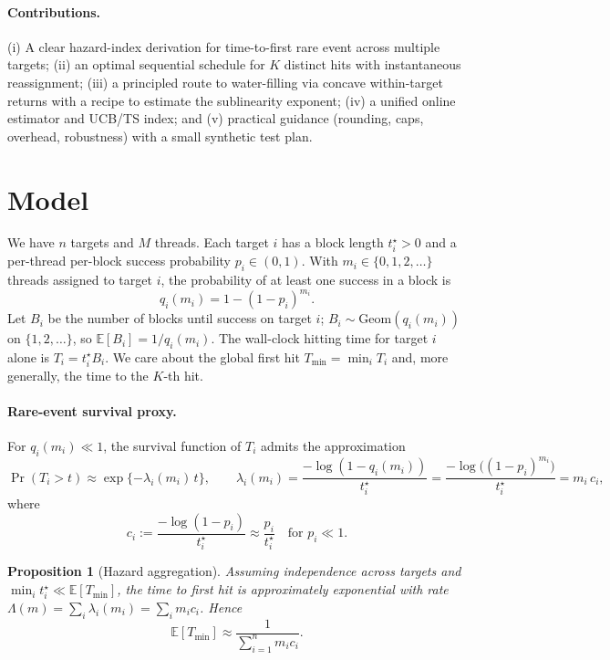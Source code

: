 \documentclass[11pt]{article}
\newtheorem{proposition}[theorem]{Proposition}
\theoremstyle{definition}
\theoremstyle{remark}
\newcommand{\E}{\mathbb{E}}
\newcommand{\1}{\mathbbm{1}}
\begin{document}
\paragraph{Contributions.}
(i) A clear hazard-index derivation for time-to-first rare event across multiple targets; (ii) an optimal sequential schedule for $K$ distinct hits with instantaneous reassignment; (iii) a principled route to water-filling via concave within-target returns with a recipe to estimate the sublinearity exponent; (iv) a unified online estimator and UCB/TS index; and (v) practical guidance (rounding, caps, overhead, robustness) with a small synthetic test plan.

\section{Model}
We have $n$ targets and $M$ threads. Each target $i$ has a block length $t_i^\star>0$ and a per-thread per-block success probability $p_i\in(0,1)$. With $m_i\in\{0,1,2,\ldots\}$ threads assigned to target $i$, the probability of at least one success in a block is
\begin{equation}
q_i(m_i) = 1-(1-p_i)^{m_i}.
\end{equation}
Let $B_i$ be the number of blocks until success on target $i$; $B_i\sim\mathrm{Geom}(q_i(m_i))$ on $\{1,2,\ldots\}$, so $\E[B_i]=1/q_i(m_i)$. The wall-clock hitting time for target $i$ alone is $T_i = t_i^\star B_i$. We care about the global first hit $T_{\min}=\min_i T_i$ and, more generally, the time to the $K$-th hit.

\paragraph{Rare-event survival proxy.}
For $q_i(m_i)\ll 1$, the survival function of $T_i$ admits the approximation
\begin{equation}
\Pr(T_i>t) \approx \exp\{-\lambda_i(m_i)\,t\},\qquad 
\lambda_i(m_i)=\frac{-\log(1-q_i(m_i))}{t_i^\star}
=\frac{-\log\big((1-p_i)^{m_i}\big)}{t_i^\star}= m_i\,c_i,
\end{equation}
where
\begin{equation}
c_i := \frac{-\log(1-p_i)}{t_i^\star}\approx \frac{p_i}{t_i^\star}\quad\text{for }p_i\ll 1.
\end{equation}

\begin{proposition}[Hazard aggregation]\label{prop:haz}
Assuming independence across targets and $\min_i t_i^\star \ll \E[T_{\min}]$, the time to first hit is approximately exponential with rate $\Lambda(m)=\sum_i \lambda_i(m_i)=\sum_i m_i c_i$. Hence
\begin{equation}
\label{eq:objective}
\E[T_{\min}] \approx \frac{1}{\sum_{i=1}^n m_i c_i}.
\end{equation}
\end{proposition}
\end{document}

